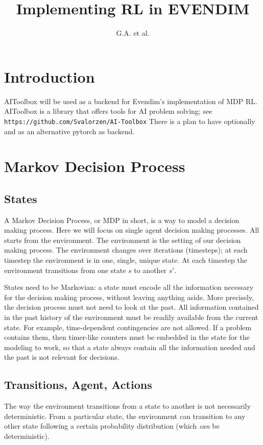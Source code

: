 \documentclass{article}
\begin{document}
\title{Implementing RL in EVENDIM}
\author{G.A. et al.}
\maketitle

\section{Introduction}
AIToolbox will be used as a backend for Evendim's implementation of MDP RL.
AIToolbox is  a library that offers tools for AI problem solving; see \nolinkurl{https://github.com/Svalorzen/AI-Toolbox}
There is a plan to have optionally and as an alternative pytorch as backend.

\section{Markov Decision Process}

\subsection{States}
A Markov Decision Process, or MDP in short, is a way to model a decision making process. Here we will focus on single agent decision making processes.
All starts from the environment. The environment is the setting of our decision making process. The environment changes over iterations (timesteps); 
at each timestep the environment is in one, single, unique state. At each timestep the environment transitions from one state $s$ to another $s'$.

States need to be Markovian: a state must encode all the information necessary for the decision making process, 
without leaving anything aside. 
More precisely, the decision process must not need to look at the past. 
All information contained in the past history of the environment must be readily available from the current state. 
For example, time-dependent contingencies are not allowed. 
If a problem contains them, then timer-like counters must be embedded in the state for the modeling to work, 
so that a state always contain all the information needed and the past is not relevant for decisions.

\subsection{Transitions, Agent, Actions}
The way the environment transitions from a state to another is not necessarily deterministic. 
From a particular state, the environment can transition to any other state following a certain probability distribution (which \emph{can} be deterministic).
\end{document}
